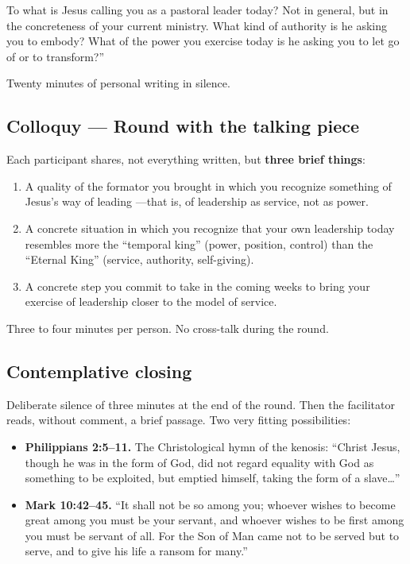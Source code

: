 \documentclass[11pt, a4paper]{article}
\begin{document}
\begin{actividad}
\begin{meditacion}
To what is Jesus calling you as a pastoral leader today? Not in general, but in the concreteness of your current ministry. What kind of authority is he asking you to embody? What of the power you exercise today is he asking you to let go of or to transform?''
\end{meditacion}

Twenty minutes of personal writing in silence.

\subsection*{Colloquy --- Round with the talking piece}

Each participant shares, not everything written, but \textbf{three brief things}:

\begin{enumerate}[label={\arabic*.}]
  \item A quality of the formator you brought in which you recognize something of Jesus's way of leading ---that is, of leadership as service, not as power.
  \item A concrete situation in which you recognize that your own leadership today resembles more the ``temporal king'' (power, position, control) than the ``Eternal King'' (service, authority, self-giving).
  \item A concrete step you commit to take in the coming weeks to bring your exercise of leadership closer to the model of service.
\end{enumerate}

Three to four minutes per person. No cross-talk during the round.

\subsection*{Contemplative closing}

Deliberate silence of three minutes at the end of the round. Then the facilitator reads, without comment, a brief passage. Two very fitting possibilities:

\begin{itemize}
  \item \textbf{Philippians 2:5--11.} The Christological hymn of the kenosis: ``Christ Jesus, though he was in the form of God, did not regard equality with God as something to be exploited, but emptied himself, taking the form of a slave\ldots''
  \item \textbf{Mark 10:42--45.} ``It shall not be so among you; whoever wishes to become great among you must be your servant, and whoever wishes to be first among you must be servant of all. For the Son of Man came not to be served but to serve, and to give his life a ransom for many.''
\end{itemize}


\end{actividad}
\end{document}
